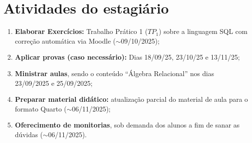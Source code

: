 \documentclass[12pt, a4paper]{article}
\begin{document}


\section{Atividades do estagiário} \label{sec:atividades}



\begin{enumerate}
    \item \textbf{Elaborar Exercícios:} Trabalho Prático 1 ($TP_1$) sobre a linguagem SQL com correção automática via Moodle ($\sim$09/10/2025);
    \item \textbf{Aplicar provas (caso necessário):} Dias 18/09/25, 23/10/25 e 13/11/25;
    \item \textbf{Ministrar aulas}, sendo o conteúdo ``Álgebra Relacional'' nos dias 23/09/2025 e 25/09/2025;
    \item \textbf{Preparar material didático:} atualização parcial do material de aula para o formato Quarto ($\sim$06/11/2025);
    \item \textbf{Oferecimento de monitorias}, sob demanda dos alunos a fim de sanar as dúvidas ($\sim$06/11/2025).
\end{enumerate}
\end{document}
